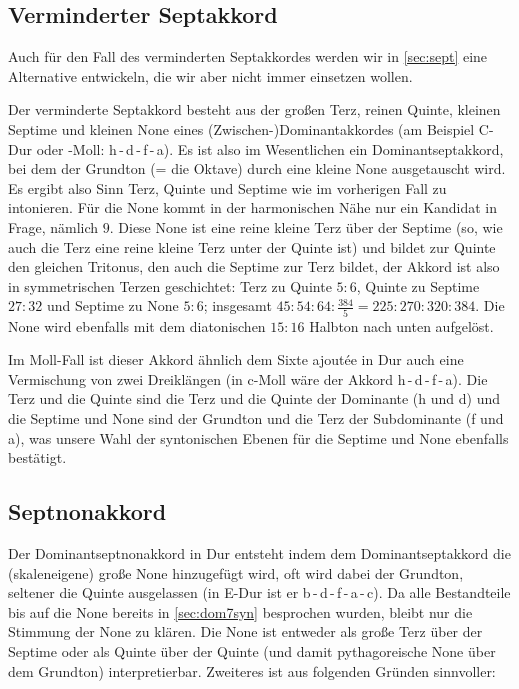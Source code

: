 \subsection{Verminderter Septakkord}

Auch für den Fall des verminderten Septakkordes werden wir in \cref{sec:sept}
eine Alternative entwickeln, die wir aber nicht immer einsetzen wollen.

Der verminderte Septakkord besteht aus der großen Terz, reinen Quinte, kleinen
Septime und kleinen None eines (Zwischen-)Dominantakkordes (am Beispiel C-Dur
oder -Moll: h\,-\,d\,-\,f\,-\,\flat a). Es ist also im Wesentlichen ein
Dominantseptakkord, bei dem der Grundton (= die Oktave) durch eine kleine
None ausgetauscht wird. Es ergibt also Sinn Terz, Quinte und Septime wie im
vorherigen Fall zu intonieren. Für die None kommt in der harmonischen Nähe nur
ein Kandidat in Frage, nämlich \flatp $9$. Diese None ist eine reine kleine Terz
über der Septime (so, wie auch die Terz eine reine kleine Terz unter der Quinte
ist) und bildet zur Quinte den gleichen Tritonus, den auch die Septime zur Terz
bildet, der Akkord ist also in symmetrischen Terzen geschichtet: Terz zu Quinte
$5:6$, Quinte zu Septime $27:32$ und Septime zu None $5:6$; insgesamt
$45:54:64:\frac{384}5 = 225:270:320:384$. Die None wird ebenfalls mit dem
diatonischen $15:16$ Halbton nach unten aufgelöst.

Im Moll-Fall ist dieser Akkord ähnlich dem Sixte ajoutée in Dur auch eine
Vermischung von zwei Dreiklängen (in c-Moll wäre der Akkord \naturalm
h\,-\,d\,-\,f\,-\,\flatp a). Die Terz und die Quinte sind die Terz und die Quinte der
Dominante (\naturalm h und d) und die Septime und None sind der Grundton und
die Terz der Subdominante (f und \flatp a), was unsere Wahl der syntonischen
Ebenen für die Septime und None ebenfalls bestätigt.

\subsection{Septnonakkord}

Der Dominantseptnonakkord in Dur entsteht indem dem Dominantseptakkord die (skaleneigene) große None hinzugefügt wird, oft wird dabei der Grundton, seltener die Quinte ausgelassen (in \flat E-Dur ist er \flat b\,-\,d\,-\,f\,-\,\flat a\,-\,c).  Da alle Bestandteile bis auf die None bereits in \cref{sec:dom7syn} besprochen wurden, bleibt nur die Stimmung der None zu klären.  Die None ist entweder als große Terz über der Septime oder als Quinte über der Quinte (und damit pythagoreische None über dem Grundton) interpretierbar.  Zweiteres ist aus folgenden Gründen sinnvoller:

